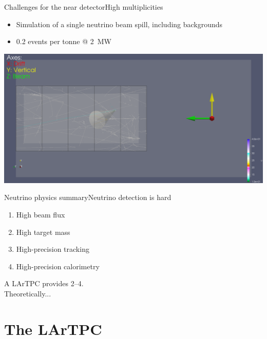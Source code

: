 \documentclass[]{beamer}
\newcommand*{\emphcol}{red}
\newcommand*{\lartpc}{{LArTPC}}
\begin{document}
\begin{frame}{Challenges for the near detector}{High multiplicities}
	\begin{itemize}
		\item Simulation of a single neutrino beam spill, including backgrounds
		\item {\color{\emphcol} \num{0.2} \Pgn events per tonne @ \SI{2}{\mega\watt}}
	\end{itemize}
	\centering
	\includegraphics[viewport=407 1112 4956 3389, clip, width=\textwidth]{pile-up/uid0_spill6_event461_gamma19_x}
\end{frame}

\begin{frame}{Neutrino physics summary}{Neutrino detection is hard}
	\begin{enumerate}
		\item High beam flux
		\item High target mass
		\item High-precision tracking
		\item High-precision calorimetry
	\end{enumerate}
	{\color{\emphcol}A \lartpc{} provides \numrange{2}{4}.\\Theoretically...}
\end{frame}

\section{The \lartpc{}}
\end{document}
